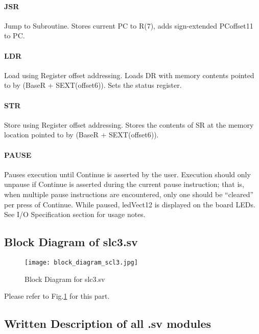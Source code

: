 \documentclass[11pt]{article}
\begin{document}
\paragraph{JSR} Jump to Subroutine. Stores current PC to R(7), adds sign-extended PCoffset11 to PC.

\paragraph{LDR} Load using Register offset addressing. Loads DR with memory contents pointed to by (BaseR + SEXT(offset6)). Sets the status register.

\paragraph{STR} Store using Register offset addressing. Stores the contents of SR at the memory location pointed to by (BaseR + SEXT(offset6)).

\paragraph{PAUSE} Pauses execution until Continue is asserted by the user. Execution should only unpause if Continue is asserted during the current pause instruction; that is, when multiple pause instructions are encountered, only one should be “cleared” per press of Continue. While paused, ledVect12 is displayed on the board LEDs. See I/O Specification section for usage notes.

\subsection{Block Diagram of slc3.sv}

\begin{figure}[h]
    \centering
    \texttt{[image: block\_diagram\_scl3.jpg]}
    \caption{Block Diagram for slc3.sv}
    \label{block_diagram}
\end{figure}

Please refer to Fig.\ref{block_diagram} for this part.


\subsection{Written Description of all .sv modules}
\end{document}
